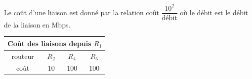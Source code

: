 \begin{minipage}{0.50\linewidth}
Le coût d'une liaison est donné par la relation coût $\dfrac{10^2}{\text{débit}}$ où le débit est le débit de la liaison en Mbps.
\end{minipage}
\hfill
\begin{minipage}{0.45\linewidth}
    \centering
    \renewcommand{\arraystretch}{1.3} %
    \begin{tabular}{|c|c|c|c|}
        \hline
        \multicolumn{4}{|c|}{\textbf{Coût des liaisons depuis $R_1$}} \\ \hline
        routeur & $R_2$ & $R_4$ & $R_5$ \\ \hline
        coût    & 10    & 100   & 100   \\ \hline
    \end{tabular}
\end{minipage}

\medskip


